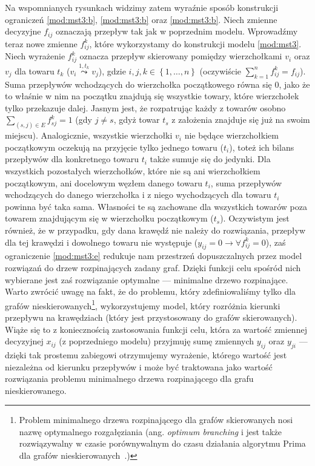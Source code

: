 Na wspomnianych rysunkach widzimy zatem wyraźnie sposób konstrukcji ograniczeń \ref{mod:mst3:b}, \ref{mod:mst3:b} oraz \ref{mod:mst3:b}. Niech zmienne decyzyjne $f_{ij}$ oznaczają przepływ tak jak w poprzednim modelu. Wprowadźmy teraz nowe zmienne $f_{ij}^{k}$, które wykorzystamy do konstrukcji modelu \ref{mod:mst3}. Niech wyrażenie $f_{ij}^{k}$ oznacza przepływ skierowany pomiędzy wierzchołkami $v_{i}$ oraz $v_{j}$ dla towaru $t_{k}$ ($v_{i} \overset{1, t_{k}}{\leadsto} v_{j}$), gdzie $i, j, k \in \left\{ 1, \dots, n \right\}$ (oczywiście $\sum_{k=1}^{n} f_{ij}^{k} = f_{ij}$). Suma przepływów wchodzących do wierzchołka początkowego równa się $0$, jako że to właśnie w nim na początku znajdują się wszystkie towary, które wierzchołek tylko przekazuje dalej. Jasnym jest, że rozpatrując każdy z towarów osobno $\sum_{\left( s, j \right ) \in E} f^{k}_{sj} = 1$ (gdy $j \neq s$, gdyż towar $t_{s}$ z założenia znajduje się już na swoim miejscu). Analogicznie, wszystkie wierzchołki $v_{i}$ nie będące wierzchołkiem początkowym oczekują na przyjęcie tylko jednego towaru ($t_{i}$), toteż ich bilans przepływów dla konkretnego towaru $t_{i}$ także sumuje się do jedynki. Dla wszystkich pozostałych wierzchołków, które nie są ani wierzchołkiem początkowym, ani docelowym węzłem danego towaru $t_{i}$, suma przepływów wchodzących do danego wierzchołka i z niego wychodzących dla towaru $t_{i}$ powinna być taka sama. Własności te są zachowane dla wszystkich towarów poza towarem znajdującym się w wierzchołku początkowym ($t_{s}$). Oczywistym jest również, że w przypadku, gdy dana krawędź nie należy do rozwiązania, przepływ dla tej krawędzi i dowolnego towaru nie występuje ($y_{ij} = 0 \rightarrow \forall f_{ij}^{k} = 0$), zaś ograniczenie \ref{mod:mst3:e} redukuje nam przestrzeń dopuszczalnych przez model rozwiązań do drzew rozpinających zadany graf. Dzięki funkcji celu spośród nich wybierane jest zaś rozwiązanie optymalne --- minimalne drzewo rozpinające. Warto zwrócić uwagę na fakt, że do problemu, który zdefiniowaliśmy tylko dla grafów nieskierowanych\footnote{Problem minimalnego drzewa rozpinającego dla grafów skierowanych nosi nazwę optymalnego rozgałęziania (ang. \textit{optimum branching} i jest także rozwiązywalny w czasie porównywalnym do czasu działania algorytmu Prima dla grafów nieskierowanych~\cite{NET:NET3230070103}.)}, wykorzystujemy model, który rozróżnia kierunki przepływu na krawędziach (który jest przystosowany do grafów skierowanych). Wiąże się to z koniecznością zastosowania funkcji celu, która za wartość zmiennej decyzyjnej $x_{ij}$ (z poprzedniego modelu) przyjmuję sumę zmiennych $y_{ij}$ oraz $y_{ji}$ --- dzięki tak prostemu zabiegowi otrzymujemy wyrażenie, którego wartość jest niezależna od kierunku przepływów i może być traktowana jako wartość rozwiązania problemu minimalnego drzewa rozpinającego dla grafu nieskierowanego.

